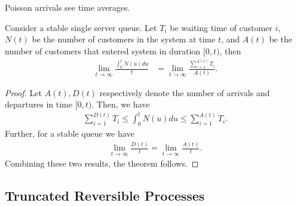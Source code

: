 \documentclass[a4paper,10pt,english]{article}
\begin{document}
\begin{thm}[PASTA] Poisson arrivals see time averages.
\end{thm}
\begin{thm} Consider a stable single server queue. Let $T_i$ be waiting time of customer $i$, $N(t)$ be the number of customers in the system at time $t$, and $A(t)$ be the number of customers that entered system in duration $[0,t)$, then
\begin{align*}
\lim_{t \to \infty}\frac{\int_{0}^tN(u)du}{t} &= \lim_{t \to \infty} \frac{\sum_{i=1}^{A(t)}T_i}{A(t)}.
\end{align*} 
\end{thm}
\begin{proof}
Let $A(t), D(t)$ respectively denote the number of arrivals and departures in time $[0,t)$. Then, we have 
\begin{align*}
\sum_{i=1}^{D(t)}T_i \leq \int_{0}^tN(u)du \leq \sum_{i=1}^{A(t)}T_i.
\end{align*}
Further, for a stable queue we have
\begin{align*}
\lim_{t \to \infty}\frac{D(t)}{t} = \lim_{t \to \infty}\frac{A(t)}{t}.
\end{align*}
Combining these two results, the theorem follows.
\end{proof}

\subsection{Truncated Reversible Processes}
\end{document}
